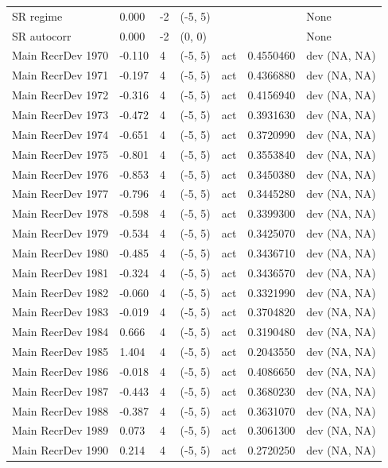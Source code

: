 \documentclass[11pt,
  english,
  a4paper,
]{article}
\begin{document}
\begin{landscape}
\begin{longtable}[t]{>{\raggedright\arraybackslash}p{8.5cm}lllll>{\raggedright\arraybackslash}p{4cm}}
SR regime & 0.000 & -2 & (-5, 5) &  &  & None\\
SR autocorr & 0.000 & -2 & (0, 0) &  &  & None\\
Main RecrDev 1970 & -0.110 & 4 & (-5, 5) & act & 0.4550460 & dev (NA, NA)\\
Main RecrDev 1971 & -0.197 & 4 & (-5, 5) & act & 0.4366880 & dev (NA, NA)\\
Main RecrDev 1972 & -0.316 & 4 & (-5, 5) & act & 0.4156940 & dev (NA, NA)\\
Main RecrDev 1973 & -0.472 & 4 & (-5, 5) & act & 0.3931630 & dev (NA, NA)\\
Main RecrDev 1974 & -0.651 & 4 & (-5, 5) & act & 0.3720990 & dev (NA, NA)\\
Main RecrDev 1975 & -0.801 & 4 & (-5, 5) & act & 0.3553840 & dev (NA, NA)\\
Main RecrDev 1976 & -0.853 & 4 & (-5, 5) & act & 0.3450380 & dev (NA, NA)\\
Main RecrDev 1977 & -0.796 & 4 & (-5, 5) & act & 0.3445280 & dev (NA, NA)\\
Main RecrDev 1978 & -0.598 & 4 & (-5, 5) & act & 0.3399300 & dev (NA, NA)\\
Main RecrDev 1979 & -0.534 & 4 & (-5, 5) & act & 0.3425070 & dev (NA, NA)\\
Main RecrDev 1980 & -0.485 & 4 & (-5, 5) & act & 0.3436710 & dev (NA, NA)\\
Main RecrDev 1981 & -0.324 & 4 & (-5, 5) & act & 0.3436570 & dev (NA, NA)\\
Main RecrDev 1982 & -0.060 & 4 & (-5, 5) & act & 0.3321990 & dev (NA, NA)\\
Main RecrDev 1983 & -0.019 & 4 & (-5, 5) & act & 0.3704820 & dev (NA, NA)\\
Main RecrDev 1984 & 0.666 & 4 & (-5, 5) & act & 0.3190480 & dev (NA, NA)\\
Main RecrDev 1985 & 1.404 & 4 & (-5, 5) & act & 0.2043550 & dev (NA, NA)\\
Main RecrDev 1986 & -0.018 & 4 & (-5, 5) & act & 0.4086650 & dev (NA, NA)\\
Main RecrDev 1987 & -0.443 & 4 & (-5, 5) & act & 0.3680230 & dev (NA, NA)\\
Main RecrDev 1988 & -0.387 & 4 & (-5, 5) & act & 0.3631070 & dev (NA, NA)\\
Main RecrDev 1989 & 0.073 & 4 & (-5, 5) & act & 0.3061300 & dev (NA, NA)\\
Main RecrDev 1990 & 0.214 & 4 & (-5, 5) & act & 0.2720250 & dev (NA, NA)\\

\end{longtable}
\end{landscape}
\end{document}

